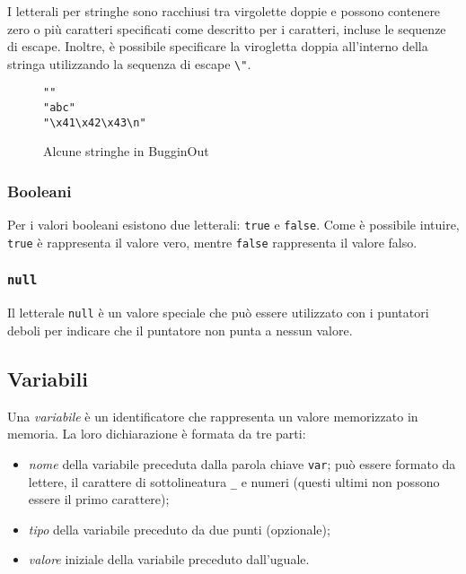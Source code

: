 I letterali per stringhe sono racchiusi tra virgolette doppie e possono contenere zero o pi\`u caratteri specificati come descritto per i caratteri, incluse le sequenze di escape. Inoltre, \`e possibile specificare la virogletta doppia all'interno della stringa utilizzando la sequenza di escape \verb|\"|.

\begin{figure}[H]
	\centering
	\begin{verbatim}
""
"abc"
"\x41\x42\x43\n"
	\end{verbatim}
	\caption{Alcune stringhe in BugginOut}
	\label{fig:string-literals-example}
\end{figure}

\subsubsection{Booleani}

Per i valori booleani esistono due letterali: \texttt{true} e \texttt{false}. Come \`e possibile intuire, \texttt{true} \`e rappresenta il valore vero, mentre \texttt{false} rappresenta il valore falso.

\subsubsection{\texttt{null}}

Il letterale \texttt{null} \`e un valore speciale che pu\`o essere utilizzato con i puntatori deboli per indicare che il puntatore non punta a nessun valore.

\subsection{Variabili}
\label{ssec:variabili}

Una \emph{variabile} \`e un identificatore che rappresenta un valore memorizzato in memoria. La loro dichiarazione \`e formata da tre parti:
\begin{itemize}
	\item \emph{nome} della variabile preceduta dalla parola chiave \texttt{var}; pu\`o essere formato da lettere, il carattere di sottolineatura \texttt{\_} e numeri (questi ultimi non possono essere il primo carattere);
	\item \emph{tipo} della variabile preceduto da due punti (opzionale);
	\item \emph{valore} iniziale della variabile preceduto dall'uguale.
\end{itemize}

